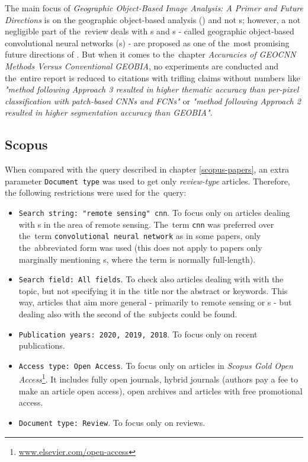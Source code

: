 The main focus of \textit{Geographic Object-Based Image Analysis: A Primer and Future Directions} is on the geographic object-based analysis () and not s; however, a not negligible part of the~review deals with s and s - called geographic object-based convolutional neural networks (s) - are proposed as one of the~most promising future directions of . But when it comes to the~chapter \textit{Accuracies of GEOCNN Methods Versus Conventional GEOBIA}, no experiments are conducted and the~entire report is reduced to citations with trifling claims without numbers like \textit{"method following Approach 3 resulted in higher thematic accuracy than per-pixel classification with patch-based CNNs and FCNs"} or \textit{"method following Approach 2 resulted in higher segmentation accuracy than GEOBIA"}.

\subsection{Scopus}
\label{scopus-reviews}

When compared with the query described in chapter \ref{scopus-papers}, an extra parameter \verb|Document type| was used to get only \textit{review-type} articles. Therefore, the following restrictions were used for the~query:

\begin{itemize}
	\item \verb|Search string: "remote sensing" cnn|. To focus only on articles dealing with s in the area of remote sensing. The~term \verb|cnn| was preferred over the~term \verb|convolutional neural network| as in some papers, only the~abbreviated form was used (this does not apply to papers only marginally mentioning s, where the term is normally full-length).
	\item \verb|Search field: All fields|. To check also articles dealing with with the topic, but not specifying it in the~title nor the abstract or keywords. This way, articles that aim more general - primarily to remote sensing or s - but dealing also with the second of the~subjects could be found.
	\item \verb|Publication years: 2020, 2019, 2018|. To focus only on recent publications.
	\item \verb|Access type: Open Access|. To focus only on articles in \textit{Scopus Gold Open Access}\footnote{\url{www.elsevier.com/open-access}}. It includes fully open journals, hybrid journals (authors pay a fee to make an article open access), open archives and articles with free promotional access.
	\item \verb|Document type: Review|. To focus only on reviews.
\end{itemize}

